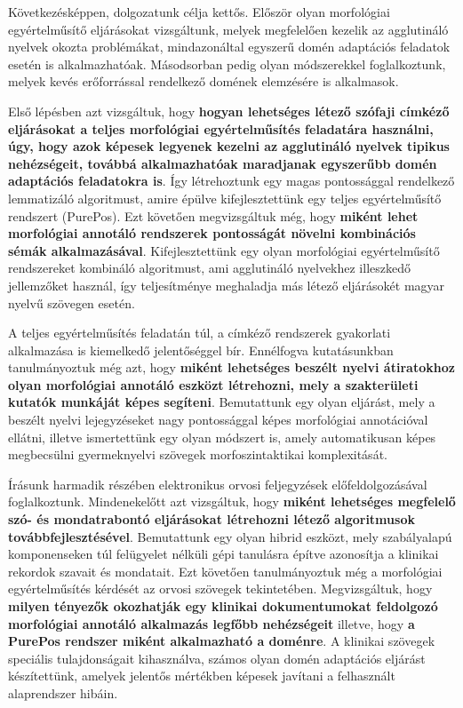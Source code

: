 Következésképpen, dolgozatunk célja kettős.
Először olyan morfológiai egyértelműsítő eljárásokat vizsgáltunk, melyek megfelelően kezelik az agglutináló nyelvek okozta problémákat, mindazonáltal egyszerű domén adaptációs feladatok esetén is alkalmazhatóak.
Másodsorban pedig olyan módszerekkel foglalkoztunk, melyek kevés erőforrással rendelkező domének elemzésére is alkalmasok.

Első lépésben azt vizsgáltuk, hogy \textbf{hogyan lehetséges létező szófaji címkéző eljárásokat a teljes morfológiai egyértelműsítés feladatára használni, úgy, hogy azok képesek legyenek kezelni az agglutináló nyelvek tipikus nehézségeit, továbbá alkalmazhatóak maradjanak egyszerűbb domén adaptációs feladatokra is}.
Így létrehoztunk egy magas pontossággal rendelkező lemmatizáló algoritmust, amire épülve kifejlesztettünk egy teljes egyértelműsítő rendszert (PurePos).
Ezt követően megvizsgáltuk még, hogy \textbf{miként lehet morfológiai annotáló rendszerek pontosságát növelni kombinációs sémák alkalmazásával}.
Kifejlesztettünk egy olyan morfológiai egyértelműsítő rendszereket kombináló algoritmust, ami agglutináló nyelvekhez illeszkedő jellemzőket használ, így teljesítménye meghaladja más létező eljárásokét magyar nyelvű szövegen esetén.

A teljes egyértelműsítés feladatán túl, a címkéző rendszerek gyakorlati alkalmazása is kiemelkedő jelentőséggel bír.
Ennélfogva kutatásunkban tanulmányoztuk még azt, hogy \textbf{miként lehetséges beszélt nyelvi átiratokhoz olyan morfológiai annotáló eszközt létrehozni, mely a szakterületi kutatók munkáját képes segíteni}.
Bemutattunk egy olyan eljárást, mely a beszélt nyelvi lejegyzéseket nagy pontossággal képes morfológiai annotációval ellátni, illetve ismertettünk egy olyan módszert is, amely automatikusan képes megbecsülni gyermeknyelvi szövegek morfoszintaktikai komplexitását.

Írásunk harmadik részében elektronikus orvosi feljegyzések előfeldolgozásával foglalkoztunk.
Mindenekelőtt azt vizsgáltuk, hogy \textbf{miként lehetséges megfelelő szó- és mondatrabontó eljárásokat létrehozni létező algoritmusok továbbfejlesztésével}.
Bemutattunk egy olyan hibrid eszközt, mely szabályalapú komponenseken túl felügyelet nélküli gépi tanulásra építve azonosítja a klinikai rekordok szavait és mondatait. 
Ezt követően tanulmányoztuk még a morfológiai egyértelműsítés kérdését az orvosi szövegek tekintetében.
Megvizsgáltuk, hogy \textbf{milyen tényezők okozhatják egy klinikai dokumentumokat feldolgozó morfológiai annotáló alkalmazás legfőbb nehézségeit} illetve, hogy \textbf{a PurePos rendszer miként alkalmazható a doménre}.
A klinikai szövegek speciális tulajdonságait kihasználva, számos olyan domén adaptációs eljárást készítettünk, amelyek jelentős mértékben képesek javítani a felhasznált alaprendszer hibáin.



